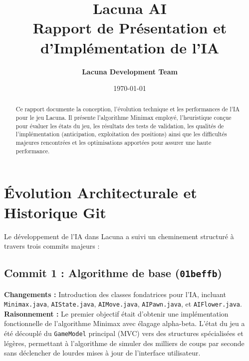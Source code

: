 \documentclass[12pt, a4paper]{article}
\title{
    \vspace{-1.5cm}
    \Huge\textbf{\textcolor{primary}{Lacuna AI}} \\ 
    \vspace{0.5cm} 
    \Large \textbf{Rapport de Présentation et d'Implémentation de l'IA}
}
\author{\textbf{Lacuna Development Team}}
\date{\today}
\begin{document}
\maketitle
\thispagestyle{empty}

\begin{abstract}
\noindent Ce rapport documente la conception, l'évolution technique et les performances de l'IA pour le jeu Lacuna. Il présente l'algorithme Minimax employé, l'heuristique conçue pour évaluer les états du jeu, les résultats des tests de validation, les qualités de l'implémentation (anticipation, exploitation des positions) ainsi que les difficultés majeures rencontrées et les optimisations apportées pour assurer une haute performance.
\end{abstract}

\vspace{1cm}
\tableofcontents
\newpage

\section{Évolution Architecturale et Historique Git}
Le développement de l'IA dans Lacuna a suivi un cheminement structuré à travers trois commits majeurs :

\subsection{Commit 1 : Algorithme de base (\texttt{01beffb})}
\begin{commitbox}
\textbf{Changements :} Introduction des classes fondatrices pour l'IA, incluant \texttt{Minimax.java}, \texttt{AIState.java}, \texttt{AIMove.java}, \texttt{AIPawn.java}, et \texttt{AIFlower.java}.\\
\textbf{Raisonnement :} Le premier objectif était d'obtenir une implémentation fonctionnelle de l'algorithme Minimax avec élagage alpha-beta. L'état du jeu a été découplé du \texttt{GameModel} principal (MVC) vers des structures spécialisées et légères, permettant à l'algorithme de simuler des milliers de coups par seconde sans déclencher de lourdes mises à jour de l'interface utilisateur.
\end{commitbox}
\end{document}
